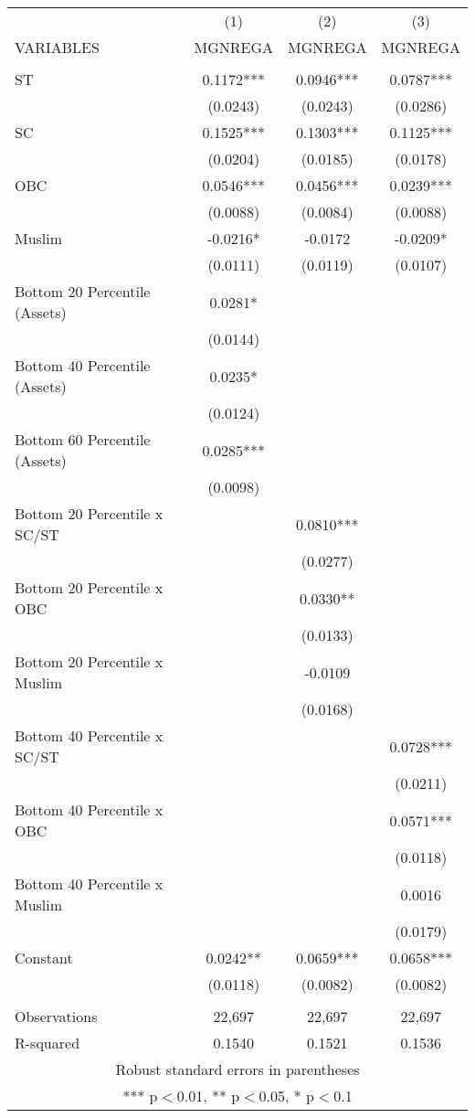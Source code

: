 \documentclass[]{article}
\begin{document}
\begin{tabular}{lccc} \hline
 & (1) & (2) & (3) \\
VARIABLES & MGNREGA & MGNREGA & MGNREGA \\ \hline
 &  &  &  \\
ST & 0.1172*** & 0.0946*** & 0.0787*** \\
 & (0.0243) & (0.0243) & (0.0286) \\
SC & 0.1525*** & 0.1303*** & 0.1125*** \\
 & (0.0204) & (0.0185) & (0.0178) \\
OBC & 0.0546*** & 0.0456*** & 0.0239*** \\
 & (0.0088) & (0.0084) & (0.0088) \\
Muslim & -0.0216* & -0.0172 & -0.0209* \\
 & (0.0111) & (0.0119) & (0.0107) \\
Bottom 20 Percentile (Assets) & 0.0281* &  &  \\
 & (0.0144) &  &  \\
Bottom 40 Percentile (Assets) & 0.0235* &  &  \\
 & (0.0124) &  &  \\
Bottom 60 Percentile (Assets) & 0.0285*** &  &  \\
 & (0.0098) &  &  \\
Bottom 20 Percentile x SC/ST &  & 0.0810*** &  \\
 &  & (0.0277) &  \\
Bottom 20 Percentile x OBC &  & 0.0330** &  \\
 &  & (0.0133) &  \\
Bottom 20 Percentile x Muslim &  & -0.0109 &  \\
 &  & (0.0168) &  \\
Bottom 40 Percentile x SC/ST &  &  & 0.0728*** \\
 &  &  & (0.0211) \\
Bottom 40 Percentile x OBC &  &  & 0.0571*** \\
 &  &  & (0.0118) \\
Bottom 40 Percentile x Muslim &  &  & 0.0016 \\
 &  &  & (0.0179) \\
Constant & 0.0242** & 0.0659*** & 0.0658*** \\
 & (0.0118) & (0.0082) & (0.0082) \\
 &  &  &  \\
Observations & 22,697 & 22,697 & 22,697 \\
 R-squared & 0.1540 & 0.1521 & 0.1536 \\ \hline
\multicolumn{4}{c}{ Robust standard errors in parentheses} \\
\multicolumn{4}{c}{ *** p$<$0.01, ** p$<$0.05, * p$<$0.1} \\
\end{tabular}
\end{document}
